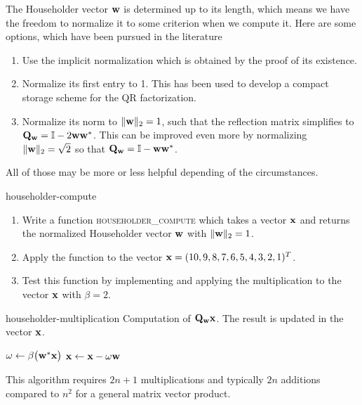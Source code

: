\begin{remark}
  \label{intro:ortho:householder-storage}
  The Householder vector $\mathbf w$ is determined up to its length, which
  means we have the freedom to normalize it to some criterion when we
  compute it. Here are some options, which have been pursued in the
  literature
  \begin{enumerate}
  \item Use the implicit normalization which is obtained by the proof
    of its existence.
  \item Normalize its first entry to 1. This has been used to develop
    a compact storage scheme for the QR factorization.
  \item Normalize its norm to $\lVert\mathbf w\rVert_2=1$, such that the
    reflection matrix simplifies to $\mathbf Q_{\mathbf w} =
    \mathbb I-2\mathbf w\mathbf w^*$. This can be improved even more by normalizing
    $\lVert\mathbf w\rVert_2=\sqrt2$ so that $\mathbf Q_{\mathbf w} = \mathbb I-\mathbf w\mathbf w^*$.
  \end{enumerate}
  All of those may be more or less helpful depending of the circumstances. 
\end{remark}

\begin{Problem}{householder-compute}
  \begin{enumerate}
  \item Write a function \textsc{householder\_compute} which takes a
    vector $\mathbf x$ and returns the normalized Householder vector
    $\mathbf w$ with $\lVert\mathbf w\rVert_2=1$.
  \item Apply the function to the vector $\mathbf x=(10,9,8,7,6,5,4,3,2,1)^T$.
  \item Test this function by implementing
     and applying the
    multiplication to the vector $\mathbf x$ with $\beta = 2$.
  \end{enumerate}
\end{Problem}

\begin{Algorithm}{householder-multiplication}
  Computation of $\mathbf Q_{\mathbf w}\mathbf x$. The result is updated in the vector
  $\mathbf x$.

  \hrulefill
  \vspace*{2mm}
  \begin{algorithmic}[1]
    \State $\omega \gets \beta \bigl(\mathbf w^*\mathbf x\bigr)$
    \State $\mathbf x \gets \mathbf x - \omega \mathbf w$
    \EndIf
    \EndFunction
  \end{algorithmic}
   \hrulefill

   This algorithm requires $2n+1$ multiplications and typically $2n$ additions
   compared to $n^2$ for a general matrix vector product.
\end{Algorithm}

